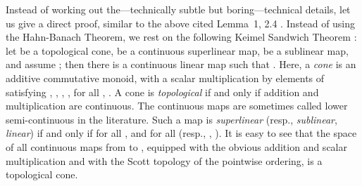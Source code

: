 \documentclass{LMCS}
\begin{document}
Instead of working out the---technically subtle but boring---technical
details, let us give a direct proof, similar to the above cited
Lemma~1, 2.4 \cite{Bourbaki:int:IX}.  Instead of using the Hahn-Banach
Theorem, we rest on the following Keimel Sandwich Theorem
\cite[Theorem~8.2]{Keimel:topcones}: let  be a topological cone,  be a continuous superlinear map,  be
a sublinear map, and assume ; then there is a continuous
linear map  such that .
Here, a \emph{cone} is an additive commutative monoid, with a scalar
multiplication by elements of  satisfying ,
, , ,  for all , .  A cone is \emph{topological} if and only if
addition and multiplication are continuous.  The continuous maps  are sometimes called lower semi-continuous in the
literature.  Such a map is \emph{superlinear} (resp.,
\emph{sublinear}, \emph{linear}) if and only if  for
all ,  and  for all
 (resp., , ).  It is easy to see that the space
 of all continuous maps from  to , equipped
with the obvious addition and scalar multiplication and with the Scott
topology of the pointwise ordering, is a topological cone.
\end{document}
